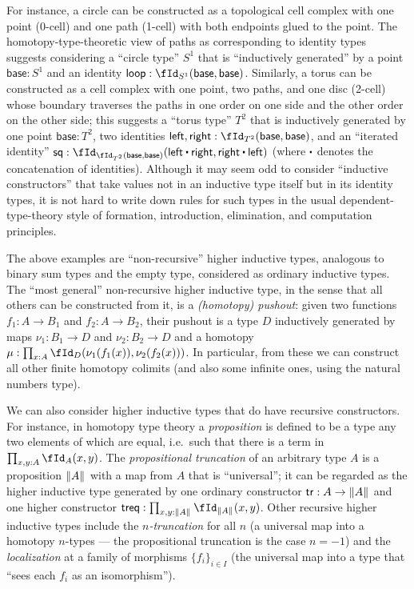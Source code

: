 \documentclass{amsart}
\def\tr{\mathsf{tr}}
\def\treq{\mathsf{treq}}
\begin{document}
For instance, a circle can be constructed as a topological cell complex with one point (0-cell) and one path (1-cell) with both endpoints glued to the point.
The homotopy-type-theoretic view of paths as corresponding to identity types suggests considering a ``circle type'' $S^1$ that is ``inductively generated'' by a point $\mathsf{base}:S^1$ and an identity $\mathsf{loop}: \id[S^1]{\mathsf{base}}{\mathsf{base}}$.
Similarly, a torus can be constructed as a cell complex with one point, two paths, and one disc (2-cell) whose boundary traverses the paths in one order on one side and the other order on the other side; this suggests a ``torus type'' $T^2$ that is inductively generated by one point $\mathsf{base}:T^2$, two identities $\mathsf{left},\mathsf{right}:\id[T^2]{\mathsf{base}}{\mathsf{base}}$, and an ``iterated identity'' $\mathsf{sq} : \id[{\id[T^2]{\mathsf{base}}{\mathsf{base}}}]{\mathsf{left}\ct\mathsf{right}}{\mathsf{right}\ct\mathsf{left}}$ (where $\ct$ denotes the concatenation of identities).
Although it may seem odd to consider ``inductive constructors'' that take values not in an inductive type itself but in its identity types, it is not hard to write down rules for such types in the usual dependent-type-theory style of formation, introduction, elimination, and computation principles.

The above examples are ``non-recursive'' higher inductive types, analogous to binary sum types and the empty type, considered as ordinary inductive types.
The ``most general'' non-recursive higher inductive type, in the sense that all others can be constructed from it, is a \emph{(homotopy) pushout}: given two functions $f_1:A\to B_1$ and $f_2:A\to B_2$, their pushout is a type $D$ inductively generated by maps $\nu_1:B_1\to D$ and $\nu_2:B_2\to D$ and a homotopy $\mu:\prod_{x:A} \id[D]{\nu_1(f_1(x))}{\nu_2(f_2(x))}$.
In particular, from these we can construct all other finite homotopy colimits (and also some infinite ones, using the natural numbers type).

We can also consider higher inductive types that do have recursive constructors.
For instance, in homotopy type theory a \emph{proposition} is defined to be a type any two elements of which are equal, i.e.\ such that there is a term in $\prod_{x,y:A} \id[A]xy$.
The \emph{propositional truncation} of an arbitrary type $A$ is a proposition $\mathopen{}\left\Vert A\right\Vert_{}\mathclose{}$ with a map from $A$ that is ``universal''; it can be regarded as the higher inductive type generated by one ordinary constructor $\tr:A\to\brck{A}$ and one higher constructor $\treq : \prod_{x,y:\brck{A}}\id[\brck{A}]{x}{y}$.
Other recursive higher inductive types include the \emph{$n$-truncation} for all $n$ (a universal map into a homotopy $n$-types --- the propositional truncation is the case $n=-1$) and the \emph{localization} at a family of morphisms $\{f_i\}_{i\in I}$ (the universal map into a type that ``sees each $f_i$ as an isomorphism'').
\end{document}
